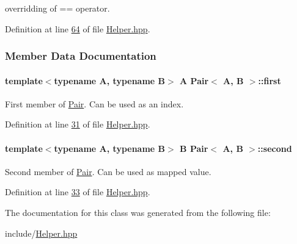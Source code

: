 overridding of \textquotesingle{}==\textquotesingle{} operator. 



Definition at line \hyperlink{Helper_8hpp_source_l00064}{64} of file \hyperlink{Helper_8hpp_source}{Helper.\+hpp}.



\subsubsection{Member Data Documentation}
\paragraph[{\texorpdfstring{first}{first}}]{\setlength{\rightskip}{0pt plus 5cm}template$<$typename A, typename B$>$ A {\bf Pair}$<$ A, B $>$\+::first}\hypertarget{classPair_a98924311a2986df358d3b1965f8abd06}{}\label{classPair_a98924311a2986df358d3b1965f8abd06}


First member of \hyperlink{classPair}{Pair}. Can be used as an index. 



Definition at line \hyperlink{Helper_8hpp_source_l00031}{31} of file \hyperlink{Helper_8hpp_source}{Helper.\+hpp}.

\paragraph[{\texorpdfstring{second}{second}}]{\setlength{\rightskip}{0pt plus 5cm}template$<$typename A, typename B$>$ B {\bf Pair}$<$ A, B $>$\+::second}\hypertarget{classPair_af49ec2d61a46cad5cd1227dba4932aff}{}\label{classPair_af49ec2d61a46cad5cd1227dba4932aff}


Second member of \hyperlink{classPair}{Pair}. Can be used as mapped value. 



Definition at line \hyperlink{Helper_8hpp_source_l00033}{33} of file \hyperlink{Helper_8hpp_source}{Helper.\+hpp}.



The documentation for this class was generated from the following file\+:\begin{DoxyCompactItemize}
\item 
include/\hyperlink{Helper_8hpp}{Helper.\+hpp}\end{DoxyCompactItemize}
